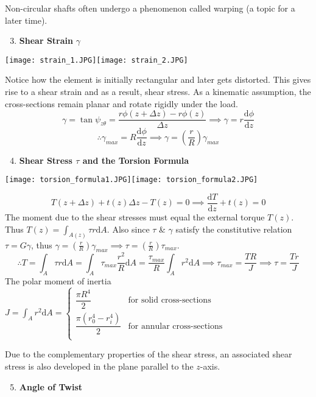 \documentclass[11pt]{article}
\theoremstyle{definition}
\let\g\gamma
\begin{document}
Non-circular shafts often undergo a phenomenon called warping (a topic for a later time).
\begin{enumerate}[label=\textbf{\roman*)}]
	\setcounter{enumi}{2}
	\item \textbf{Shear Strain} $\g$
\end{enumerate}
\vspace{-6mm}

\begin{center}
\texttt{[image: strain\_1.JPG]}\hspace{0.1\textwidth}\texttt{[image: strain\_2.JPG]}
\end{center}
\newpage
Notice how the element is initially rectangular and later gets distorted. This gives rise to a shear strain and as a result, shear stress. As a kinematic assumption, the cross-sections remain planar and rotate rigidly under the load.
$$\g=\tan\psi_{z\theta}=\frac{r\phi(z+\Delta z)-r\phi(z)}{\Delta z}\implies \boxed{\g=r\frac{\text{d}\phi}{\text{d}z}}$$
$$\therefore \g_{max}=R\frac{\text{d}\phi}{\text{d}z}\implies \g=\left(\frac{r}{R}\right)\g_{max}$$
\vspace{-6mm}
\begin{enumerate}[label=\textbf{\roman*)}]
	\setcounter{enumi}{3}
	\item \textbf{Shear Stress  $\tau$ and the Torsion Formula}
\end{enumerate}
\vspace{-10mm}

\begin{center}
\texttt{[image: torsion\_formula1.JPG]}\hspace{0.1\textwidth}\texttt{[image: torsion\_formula2.JPG]}
\end{center}
\vspace{-3mm}
$$T(z+\Delta z)+t(z)\Delta z-T(z)=0\implies \frac{\text{d}T}{\text{d}z}+t(z)=0$$
The moment due to the shear stresses must equal the external torque $T(z)$. Thus $\displaystyle T(z)=\int_{A(z)}\tau r\text{d}A$. Also since $\tau$ \& $\g$ satisfy the constitutive relation $\boxed{\tau=G\g}$, thus $\displaystyle \g=\left(\frac{r}{R}\right)\g_{max}\implies \tau=\left(\frac{r}{R}\right)\tau_{max}$.
$$\therefore T=\int_A\tau r\text{d}A=\int_A \tau_{max}\frac{r^2}{R}\text{d}A=\frac{\tau_{max}}{R}\int_Ar^2\text{d}A\implies \boxed{\tau_{max}=\frac{TR}{J}\implies \tau=\frac{Tr}{J}}$$
The polar moment of inertia $\displaystyle J=\int_Ar^2\text{d}A=\left\lbrace\begin{array}{ll}
\dfrac{\pi R^4}{2}&\text{for solid cross-sections}\\
\dfrac{\pi (r_0^4-r_i^4)}{2}&\text{for annular cross-sections}\\
\end{array}\right.$

Due to the complementary properties of the shear stress, an associated shear stress is also developed in the plane parallel to the $z$-axis.
\vspace{-2mm}
\begin{enumerate}[label=\textbf{\roman*)}]
	\setcounter{enumi}{4}
	\item \textbf{Angle of Twist}
\end{enumerate}
\end{document}
